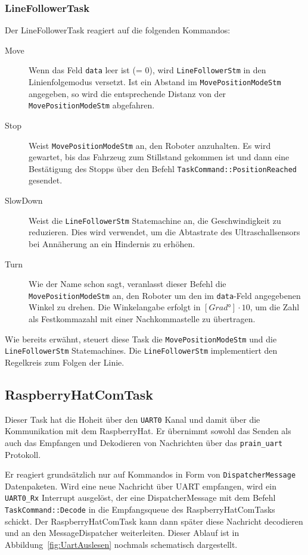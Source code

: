 \documentclass[main.tex]{subfiles} %
\begin{document}
\subsubsection*{LineFollowerTask}
Der LineFollowerTask reagiert auf die folgenden Kommandos:

\begin{description}
    \item[Move] Wenn das Feld \texttt{data} leer ist (= 0), wird \texttt{LineFollowerStm}
        in den Linienfolgemodus versetzt. Ist ein Abstand im
        \texttt{MovePositionModeStm} angegeben, so wird die entsprechende Distanz von
        der \texttt{MovePositionModeStm} abgefahren.
    \item[Stop] Weist \texttt{MovePositionModeStm} an, den Roboter anzuhalten. Es wird
        gewartet, bis das Fahrzeug zum Stillstand gekommen ist und dann eine
        Bestätigung des Stopps über den Befehl \texttt{TaskCommand::PositionReached}
        gesendet. \item[SlowDown] Weist die \texttt{LineFollowerStm} Statemachine an, die
        Geschwindigkeit zu reduzieren. Dies wird verwendet, um die Abtastrate des
        Ultraschallsensors bei Annäherung an ein Hindernis zu erhöhen. \item[Turn] Wie der Name schon sagt, veranlasst dieser Befehl die
        \texttt{MovePositionModeStm} an, den Roboter um den im \texttt{data}-Feld
        angegebenen Winkel zu drehen. Die Winkelangabe erfolgt in $[Grad °] \cdot 10$,
        um die Zahl als Festkommazahl mit einer Nachkommastelle zu übertragen.
\end{description}

Wie bereits erwähnt, steuert diese Task die \texttt{MovePositionModeStm} und
die \texttt{LineFollowerStm} Statemachines. Die \texttt{LineFollowerStm}
implementiert den Regelkreis zum Folgen der Linie.

\subsection*{RaspberryHatComTask}
Dieser Task hat die Hoheit über den \texttt{UART0} Kanal und damit über die
Kommunikation mit dem RaspberryHat. Er übernimmt sowohl das Senden als auch das
Empfangen und Dekodieren von Nachrichten über das \texttt{prain\_uart}
Protokoll.

Er reagiert grundsätzlich nur auf Kommandos in Form von
\texttt{DispatcherMessage} Datenpaketen. Wird eine neue Nachricht über UART
empfangen, wird ein \texttt{UART0\_Rx} Interrupt ausgelöst, der eine
DispatcherMessage mit dem Befehl \texttt{TaskCommand::Decode} in die
Empfangsqueue des RaspberryHatComTasks schickt. Der RaspberryHatComTask kann
dann später diese Nachricht decodieren und an den MessageDispatcher
weiterleiten. Dieser Ablauf ist in Abbildung~\ref{fig:UartAuslesen} nochmals
schematisch dargestellt.
\end{document}

